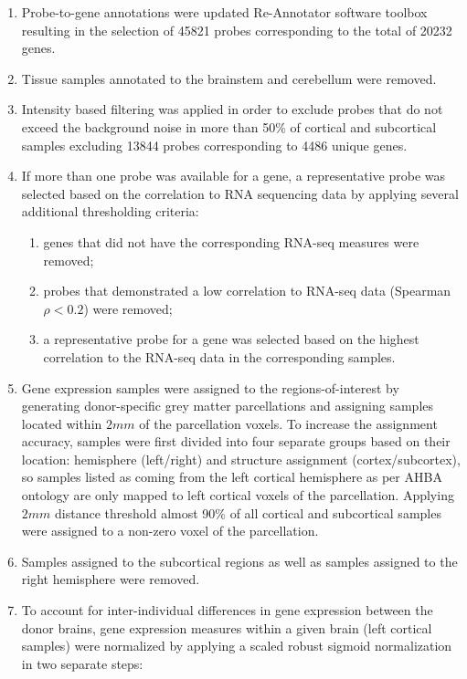 \begin{enumerate}\addtocounter{enumii}{5}%
      \item Probe-to-gene annotations were updated Re-Annotator software toolbox \citep{Arloth2015} resulting in the selection of \num{45821} probes corresponding to the total of \num{20232} genes. 
      \item Tissue samples annotated to the brainstem and cerebellum were removed. 
      \item Intensity based filtering was applied in order to exclude probes that do not exceed the background noise in more than 50\% of cortical and subcortical samples excluding \num{13844} probes corresponding to \num{4486} unique genes. 
      \item If more than one probe was available for a gene, a representative probe was selected based on the correlation to RNA sequencing data \citep{Miller2014a} by applying several additional thresholding criteria:
      \begin{enumerate}
      \item genes that did not have the corresponding RNA-seq measures were removed;
      \item probes that demonstrated a low correlation to RNA-seq data (Spearman $\rho<0.2$) were removed;
	  \item a representative probe for a gene was selected based on the highest correlation to the RNA-seq data in the corresponding samples.	      
      \end{enumerate}
      \item Gene expression samples were assigned to the regions-of-interest by generating donor-specific grey matter parcellations and assigning samples located within $2mm$ of the parcellation voxels. To increase the assignment accuracy, samples were first divided into four separate groups based on their location: hemisphere (left/right) and structure assignment (cortex/subcortex), so samples listed as coming from the left cortical hemisphere as per AHBA ontology are only mapped to left cortical voxels of the parcellation. Applying $2mm$ distance threshold almost 90\% of all cortical and subcortical samples were assigned to a non-zero voxel of the parcellation. 
      \item Samples assigned to the subcortical regions as well as samples assigned to the right hemisphere were removed. 
      \item To account for inter-individual differences in gene expression between the donor brains, gene expression measures within a given brain (left cortical samples) were normalized by applying a scaled robust sigmoid normalization \citep{Arnatkeviciute2019} in two separate steps: 

\end{enumerate}
